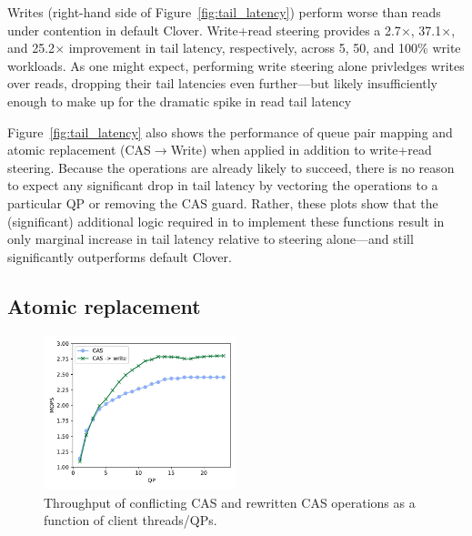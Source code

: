 
Writes (right-hand side of Figure~\ref{fig:tail_latency}) perform
worse than reads under contention in default Clover. Write+read
steering provides a 2.7$\times$, 37.1$\times$, and 25.2$\times$
improvement in tail latency, respectively, across 5, 50, and 100\%
write workloads.  As one might expect, performing write steering alone
privledges writes over reads, dropping their tail latencies even
further---but likely insufficiently enough to make up for the dramatic
spike in read tail latency

Figure~\ref{fig:tail_latency} also shows the performance of queue pair
mapping and atomic replacement (CAS$\rightarrow$Write) when applied in addition
to write+read steering.  Because the operations are already likely to
succeed, there is no reason to expect any significant drop in tail
latency by vectoring the operations to a particular QP or removing the
CAS guard.  Rather, these plots show that the (significant) additional
logic required in {\sword} to implement these functions result in only
marginal increase in tail latency relative to steering alone---and still
significantly outperforms default Clover.



\subsection{Atomic replacement}

\begin{figure}
    \includegraphics[width=0.5\textwidth]{fig/cas_vs_swap.pdf}
    \caption{Throughput of conflicting CAS and rewritten CAS operations as a function of client threads/QPs.}
    \label{fig:cas_vs_swap}
\end{figure}

